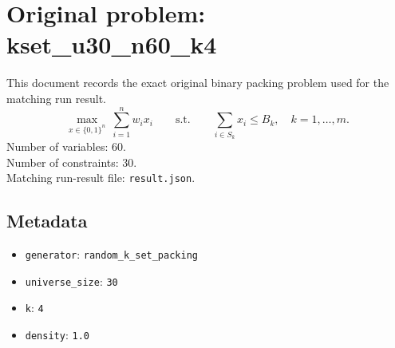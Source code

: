 \documentclass[11pt]{article}
\begin{document}
\section*{Original problem: kset\_u30\_n60\_k4}
This document records the exact original binary packing problem used for the matching run result.
\[
\max_{x\in\{0,1\}^n}\ \sum_{i=1}^n w_i x_i
\qquad\text{s.t.}\qquad
\sum_{i\in S_k} x_i \le B_k,\quad k=1,\dots,m.
\]
Number of variables: 60.\\
Number of constraints: 30.\\
Matching run-result file: \texttt{result.json}.
\subsection*{Metadata}
\begin{itemize}
\item \texttt{generator}: \texttt{random\_k\_set\_packing}
\item \texttt{universe\_size}: \texttt{30}
\item \texttt{k}: \texttt{4}
\item \texttt{density}: \texttt{1.0}
\end{itemize}
\end{document}
